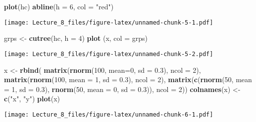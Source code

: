 \documentclass[]{article}
\newenvironment{Shaded}{\begin{snugshade}}{\end{snugshade}}
\newcommand{\DataTypeTok}[1]{\textcolor[rgb]{0.13,0.29,0.53}{#1}}
\newcommand{\DecValTok}[1]{\textcolor[rgb]{0.00,0.00,0.81}{#1}}
\newcommand{\FloatTok}[1]{\textcolor[rgb]{0.00,0.00,0.81}{#1}}
\newcommand{\KeywordTok}[1]{\textcolor[rgb]{0.13,0.29,0.53}{\textbf{#1}}}
\newcommand{\NormalTok}[1]{#1}
\newcommand{\StringTok}[1]{\textcolor[rgb]{0.31,0.60,0.02}{#1}}
\begin{document}
\begin{Shaded}
\begin{Highlighting}[]
\KeywordTok{plot}\NormalTok{(hc)}
\KeywordTok{abline}\NormalTok{(}\DataTypeTok{h =} \DecValTok{6}\NormalTok{, }\DataTypeTok{col =} \StringTok{"red"}\NormalTok{)}
\end{Highlighting}
\end{Shaded}

\texttt{[image: Lecture\_8\_files/figure-latex/unnamed-chunk-5-1.pdf]}

\begin{Shaded}
\begin{Highlighting}[]
\NormalTok{grps <-}\StringTok{ }\KeywordTok{cutree}\NormalTok{(hc, }\DataTypeTok{h =} \DecValTok{4}\NormalTok{)}
\KeywordTok{plot}\NormalTok{ (x, }\DataTypeTok{col =}\NormalTok{ grps)}
\end{Highlighting}
\end{Shaded}

\texttt{[image: Lecture\_8\_files/figure-latex/unnamed-chunk-5-2.pdf]}

\begin{Shaded}
\begin{Highlighting}[]
\NormalTok{x <-}\StringTok{ }\KeywordTok{rbind}\NormalTok{(}
\KeywordTok{matrix}\NormalTok{(}\KeywordTok{rnorm}\NormalTok{(}\DecValTok{100}\NormalTok{, }\DataTypeTok{mean=}\DecValTok{0}\NormalTok{, }\DataTypeTok{sd =} \FloatTok{0.3}\NormalTok{), }\DataTypeTok{ncol =} \DecValTok{2}\NormalTok{), }
\KeywordTok{matrix}\NormalTok{(}\KeywordTok{rnorm}\NormalTok{(}\DecValTok{100}\NormalTok{, }\DataTypeTok{mean =} \DecValTok{1}\NormalTok{, }\DataTypeTok{sd =} \FloatTok{0.3}\NormalTok{), }\DataTypeTok{ncol =} \DecValTok{2}\NormalTok{), }
\KeywordTok{matrix}\NormalTok{(}\KeywordTok{c}\NormalTok{(}\KeywordTok{rnorm}\NormalTok{(}\DecValTok{50}\NormalTok{, }\DataTypeTok{mean =} \DecValTok{1}\NormalTok{, }\DataTypeTok{sd =} \FloatTok{0.3}\NormalTok{), }
        \KeywordTok{rnorm}\NormalTok{(}\DecValTok{50}\NormalTok{, }\DataTypeTok{mean =} \DecValTok{0}\NormalTok{, }\DataTypeTok{sd =} \FloatTok{0.3}\NormalTok{)), }\DataTypeTok{ncol =} \DecValTok{2}\NormalTok{))}
\KeywordTok{colnames}\NormalTok{(x) <-}\StringTok{ }\KeywordTok{c}\NormalTok{(}\StringTok{"x"}\NormalTok{, }\StringTok{"y"}\NormalTok{)}
\KeywordTok{plot}\NormalTok{(x)}
\end{Highlighting}
\end{Shaded}

\texttt{[image: Lecture\_8\_files/figure-latex/unnamed-chunk-6-1.pdf]}
\end{document}
